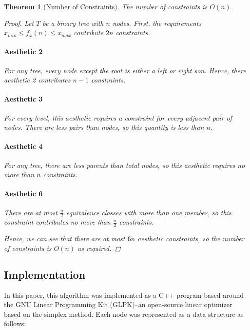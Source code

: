 \documentclass[11pt]{report}
\newtheorem{theorem}{Theorem}[section]
\begin{document}
\begin{theorem}[Number of Constraints]
    The number of constraints is $O(n)$.
    
    \begin{proof}
        Let $T$ be a binary tree with $n$ nodes. First, the requirements $x_{min} \leq f_x(n) \leq x_{max}$ contribute $2n$ constraints.
        
        \paragraph{Aesthetic 2} For any tree, every node except the root is either a left or right son. Hence, there aesthetic 2 contributes $n - 1$ constraints.
        
        \paragraph{Aesthetic 3} For every level, this aesthetic requires a constraint for every adjacent pair of nodes. There are less pairs than nodes, so this quantity is less than $n$.
        
        \paragraph{Aesthetic 4} For any tree, there are less parents than total nodes, so this aesthetic requires no more than $n$ constraints.
        
        \paragraph{Aesthetic 6} There are at most $\frac{n}{2}$ equivalence classes with more than one member, so this constraint contributes no more than $\frac{n}{2}$ constraints.
        
        \bigskip
        
        Hence, we can see that there are at most $6n$ aesthetic constraints, so the number of constraints is $O(n)$ as required.
    \end{proof}
\end{theorem}

\subsection{Implementation}
In this paper, this algorithm was implemented as a C++ program based around the GNU Linear Programming Kit (GLPK)--an open-source linear optimizer based on the simplex method. Each node was represented as a data structure as follows:
\end{document}
